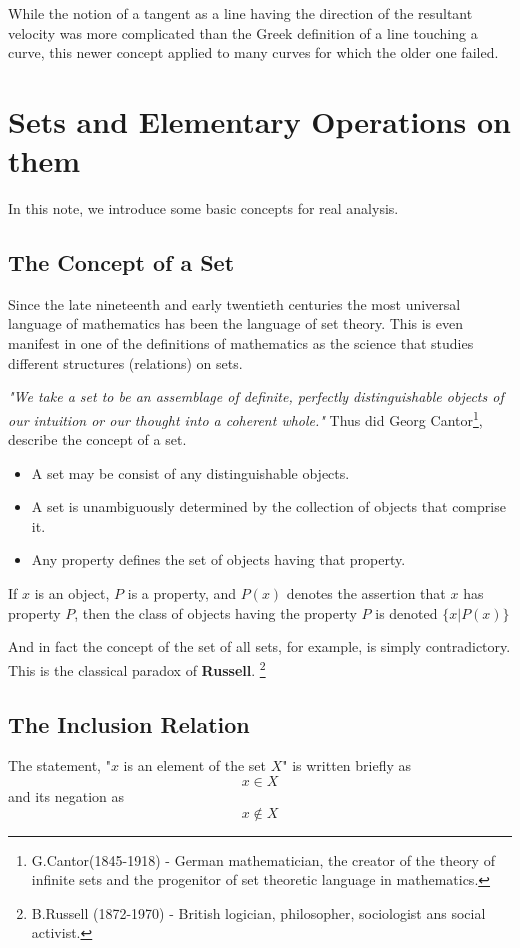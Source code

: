 \documentclass[a4paper,12pt]{article} %
\begin{document}
While the notion of a tangent as a line having the direction of the 
resultant velocity was more complicated than the Greek definition 
of a line touching a curve, this newer concept applied to many 
curves for which the older one failed.


\section{Sets and Elementary Operations on them}

In this note, we introduce some basic concepts for real 
analysis.

\subsection{The Concept of a Set}
Since the late nineteenth and early twentieth centuries 
the most universal language of mathematics has been the 
language of set theory. This is even manifest in one of 
the definitions of mathematics as the science that 
studies different structures (relations) on sets.

\emph{"We take a set to be an assemblage of definite, 
perfectly distinguishable objects of our intuition or 
our thought into a coherent whole."} Thus did Georg 
Cantor\footnote{G.Cantor(1845-1918) - German 
mathematician, the creator of the theory of infinite 
sets and the progenitor of set theoretic language in 
mathematics.}, describe the concept of a set.

\begin{itemize}
    \item A set may be consist of any distinguishable 
        objects.
    \item A set is unambiguously determined by the 
        collection of objects that comprise it.
    \item Any property defines the set of objects 
        having that property.
\end{itemize}

If $x$ is an object, $P$ is a property, and $P(x)$ 
denotes the assertion that $x$ has property $P$, 
then the class of objects having the property
$P$ is denoted $\{x\lvert P(x)\}$

And in fact the concept of the set of all sets, for 
example, is simply contradictory. This is the 
classical paradox of \textbf{Russell}. \footnote{B.Russell (1872-1970) - British logician,
philosopher, sociologist ans social activist.}

\subsection{The Inclusion Relation}
The statement, "$x$ is an element of the set $X$" is written 
briefly as
\[ 
    x\in X
\]
and its negation as
\[
    x \notin X
\]
\end{document}
